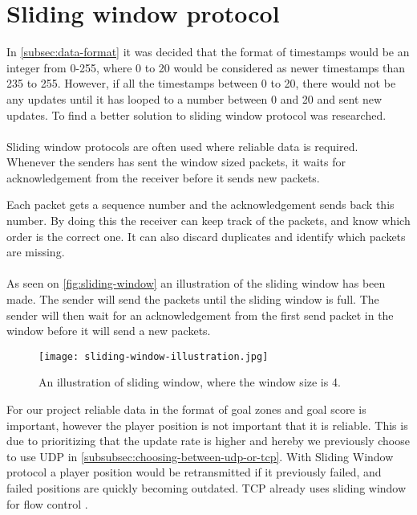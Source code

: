 \section{Sliding window protocol}
In \autoref{subsec:data-format} it was decided that the format of timestamps would be an integer from 0-255, where 0 to 20 would be considered as newer timestamps than 235 to 255.
However, if all the timestamps between 0 to 20, there would not be any updates until it has looped to a number between 0 and 20 and sent new updates.
To find a better solution to sliding window protocol was researched.
\\\\
Sliding window protocols are often used where reliable data is required.
Whenever the senders has sent the window sized packets, it waits for acknowledgement from the receiver before it sends new packets.

Each packet gets a sequence number and the acknowledgement sends back this number.
By doing this the receiver can keep track of the packets, and know which order is the correct one.
It can also discard duplicates and identify which packets are missing.
\\\\
As seen on \autoref{fig:sliding-window} an illustration of the sliding window has been made.
The sender will send the packets until the sliding window is full.
The sender will then wait for an acknowledgement from the first send packet in the window before it will send a new packets.

\begin{figure}[H]
    \centering
    \texttt{[image: sliding-window-illustration.jpg]}
    \caption{An illustration of sliding window, where the window size is 4.}
    \label{fig:sliding-window}
\end{figure}
\noindent
For our project reliable data in the format of goal zones and goal score is important, however the player position is not important that it is reliable.
This is due to prioritizing that the update rate is higher and hereby we previously choose to use UDP in \autoref{subsubsec:choosing-between-udp-or-tcp}.
With Sliding Window protocol a player position would be retransmitted if it previously failed, and failed positions are quickly becoming outdated.
TCP already uses sliding window for flow control \cite{ibm:sliding-window}.
